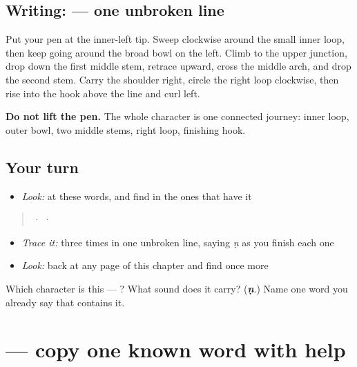 \subsection*{Writing:  — one unbroken line}

Put your pen at the inner-left tip. Sweep clockwise around the small inner loop, then keep going around the broad bowl on the left. Climb to the upper junction, drop down the first middle stem, retrace upward, cross the middle arch, and drop the second stem. Carry the shoulder right, circle the right loop clockwise, then rise into the hook above the line and curl left.

\textbf{Do not lift the pen.} The whole character is one connected journey: inner loop, outer bowl, two middle stems, right loop, finishing hook.

\subsection*{Your turn}
\begin{itemize}
\raggedright
  \item \emph{Look:} at these words, and find  in the ones that have it
\end{itemize}

\begin{quote}
  ·    ·  
\end{quote}

\begin{itemize}
\raggedright
  \item \emph{Trace it:}  three times in one unbroken line, saying \emph{ṇ} as you finish each one
  \item \emph{Look:} back at any page of this chapter and find  once more
\end{itemize}

\begin{tcolorbox}[breakable,colback=teal!4,colframe=teal!35!black,title={Before you move on}]
Which character is this — ? What sound does it carry? (\emph{\textbf{ṇ}}.) Name one word you already say that contains it.
\end{tcolorbox}
\section[\texorpdfstring{\ml{സന്തോഷം} (santōṣaṁ)}{സന്തോഷം (santōṣaṁ)}]{ — copy one known word with help}

